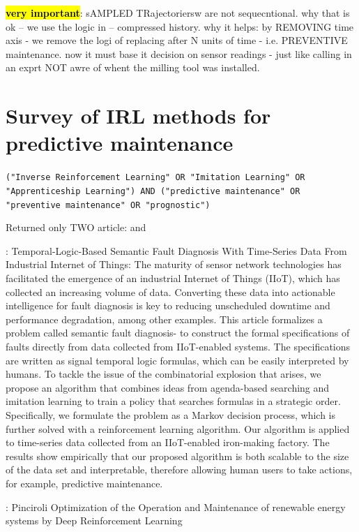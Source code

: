 \documentclass{article}
\newcommand{\hlc}[2][purple!10]{{\colorlet{foo}{#1} \sethlcolor{foo}\hl{#2}}}
\begin{document}
\hlc{\textbf{very important}}: sAMPLED TRajectoriersw  are not sequecntional. why that is ok -- we use the logic in \cite{berant2015imitation} -- compressed history. why it helps: by REMOVING time axis - we remove the logi of replacing after N units of time - i.e. PREVENTIVE maintenance. now it must base it decision on sensor readings - just like calling in an exprt NOT awre of whent the milling tool was installed.


\par


\section{Survey of IRL methods for predictive maintenance}

\texttt{("Inverse Reinforcement Learning" OR "Imitation Learning" OR "Apprenticeship Learning") AND ("predictive maintenance" OR "preventive maintenance" OR "prognostic")}

Returned only TWO article: \cite{Chen-2021-Temporal} and \cite{Pinciroli2022-752} 	

\cite{Chen-2021-Temporal}: Temporal-Logic-Based Semantic Fault Diagnosis With Time-Series Data From Industrial Internet of Things:
The maturity of sensor network technologies has facilitated the emergence of an industrial Internet of Things (IIoT), which has collected an increasing volume of data. Converting these data into actionable intelligence for fault diagnosis is key to reducing unscheduled downtime and performance degradation, among other examples. This article formalizes a problem called semantic fault diagnosis- to construct the formal specifications of faults directly from data collected from IIoT-enabled systems. The specifications are written as signal temporal logic formulas, which can be easily interpreted by humans. To tackle the issue of the combinatorial explosion that arises, we propose an algorithm that combines ideas from agenda-based searching and imitation learning to train a policy that searches formulas in a strategic order. Specifically, we formulate the problem as a Markov decision process, which is further solved with a reinforcement learning algorithm. Our algorithm is applied to time-series data collected from an IIoT-enabled iron-making factory. The results show empirically that our proposed algorithm is both scalable to the size of the data set and interpretable, therefore allowing human users to take actions, for example, predictive maintenance.

\cite{Pinciroli2022-752}: Pinciroli Optimization of the Operation and Maintenance of renewable energy systems by Deep Reinforcement Learning
\end{document}
